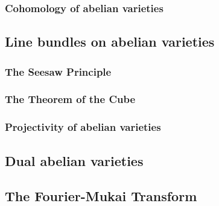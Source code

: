         \subsubsection{Cohomology of abelian varieties}
        
    \subsection{Line bundles on abelian varieties}
        \subsubsection{The Seesaw Principle}
        
        \subsubsection{The Theorem of the Cube}
        
        \subsubsection{Projectivity of abelian varieties}
        
    \subsection{Dual abelian varieties}
    
    \subsection{The Fourier-Mukai Transform}